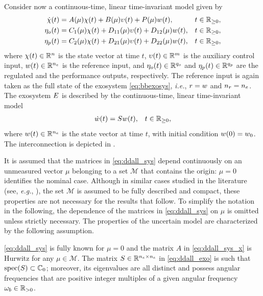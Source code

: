 Consider now a continuous-time, linear time-invariant model given by
\begin{subequations}
  \label{eq:ddall_sys}
  \begin{align}
    \dot{\chi}(t) &= A(\mu)\chi(t) + B(\mu)\upsilon(t) + P(\mu)w(t), & t\in\mathbb{R}_{\geq 0}, \label{eq:ddall_sys_x}\\
    \eta_o(t) & = C_1(\mu)\chi(t) + D_{11}(\mu)\upsilon(t) + D_{12}(\mu)w(t), & t\in\mathbb{R}_{\geq 0}, \label{eq:ddall_sys_z0}\\
    \eta_p(t) & = C_2(\mu)\chi(t) + D_{21}(\mu)\upsilon(t) + D_{22}(\mu)w(t), & t\in\mathbb{R}_{\geq 0}, \label{eq:ddall_sys_z}
  \end{align}
\end{subequations}
where $\chi(t)\in\mathbb{R}^n$ is the state vector at time $t$, $\upsilon(t)\in\mathbb{R}^m$ is the auxiliary control input, $w(t)\in\mathbb{R}^{n_e}$ is the reference input, and $\eta_o(t)\in\mathbb{R}^{{q_o}}$ and $\eta_p(t)\in\mathbb{R}^{{q_p}}$ are the regulated and the performance outputs, respectively. The reference input is again taken as the full state of the exosystem \eqref{eq:bbexosys}, \emph{i.e.}, $r = w$ and ${n_r} = {n_e}$. The exosystem  $E$ is described by the continuous-time, linear time-invariant model
\begin{align}
  \label{eq:ddall_exo}
  \dot{w}(t) &= Sw(t), & t\in\mathbb{R}_{\geq 0},
\end{align}
where $w(t)\in\mathbb{R}^{{n_e}}$ is the state vector at time $t$, with initial condition $w(0) = w_0$. The interconnection is depicted in .

It is assumed that the matrices in \eqref{eq:ddall_sys} depend continuously on an unmeasured vector $\mu$ belonging to a set $\mathcal{M}$ that contains the origin: $\mu = 0$ identifies the nominal case. Although in similar cases studied in the literature (see, \emph{e.g.}, \cite{cocetti_linear_2018}), the set $\mathcal{M}$ is assumed to be fully described and compact, these properties are not necessary for the results that follow. To simplify the notation in the following, the dependence of the matrices in \eqref{eq:ddall_sys} on $\mu$ is omitted unless strictly necessary. The properties of the uncertain model are characterized by the following assumption.

\begin{assumption}
  \label{ass:ddall_plant_exo}
  \eqref{eq:ddall_sys} is fully known for $\mu=0$ and the matrix $A$ in \eqref{eq:ddall_sys_x} is Hurwitz for any $\mu\in\mathcal{M}$.
  The matrix $S\in\mathbb{R}^{{n_e}\times{n_e}}$ in \eqref{eq:ddall_exo} is such that $\operatorname{spec}(S)\subset\mathbb{C}_{0}$; moreover, its eigenvalues are all distinct and possess angular frequencies that are positive integer multiples of a given angular frequency $\omega_b\in\mathbb{R}_{>0}$.\closestatement
\end{assumption}

